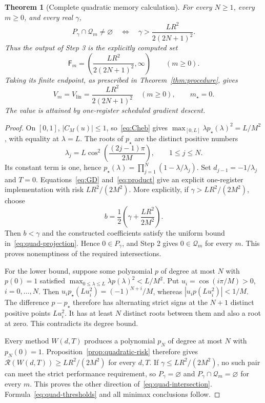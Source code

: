 \documentclass[11pt]{article}
\numberwithin{equation}{section}
\newtheorem{theorem}{Theorem}[section]
\theoremstyle{definition}
\newcommand{\Q}{\mathcal Q}
\newcommand{\risk}{\mathcal R}
\begin{document}
\begin{theorem}[Complete quadratic memory calculation]\label{thm:quadratic}
For every $N\ge1$, every $m\ge0$, and every real $\gamma$,
\begin{equation}
 P_\gamma\cap\Q_m\ne\varnothing
 \quad\Longleftrightarrow\quad
 \gamma>\frac{LR^2}{2(2N+1)^2}.
 \label{eq:quad-intersection}
\end{equation}
Thus the output of Step 3 is the explicitly computed set
\begin{equation}
 \mathsf F_m=\left(\frac{LR^2}{2(2N+1)^2},\infty\right)
 \qquad(m\ge0).
 \label{eq:quad-thresholds}
\end{equation}
Taking its finite endpoint, as prescribed in Theorem~\ref{thm:procedure}, gives
\begin{equation}
 V_m=V_{\mathrm{lin}}=\frac{LR^2}{2(2N+1)^2}
 \quad(m\ge0),\qquad m_\star=0.
 \label{eq:quad-values}
\end{equation}
The value is attained by one-register scheduled gradient descent.
\end{theorem}
\begin{proof}
On $[0,1]$, $|C_M(u)|\le1$, so~\eqref{eq:Cheb} gives
$\max_{[0,L]}\lambda p_\star(\lambda)^2=L/M^2$, with equality at $\lambda=L$.
The roots of $p_\star$ are the distinct positive numbers
\[
 \lambda_j=L\cos^2\left(\frac{(2j-1)\pi}{2M}\right),
 \qquad 1\le j\le N.
\]
Its constant term is one, hence
$p_\star(\lambda)=\prod_{j=1}^N(1-\lambda/\lambda_j)$.
Set $d_{j-1}=-1/\lambda_j$ and $T=0$. Equations~\eqref{eq:GD} and~\eqref{eq:product} give an explicit one-register implementation with risk $LR^2/(2M^2)$.
More explicitly, if $\gamma>LR^2/(2M^2)$, choose
\[
 b=\frac12\left(\gamma+\frac{LR^2}{2M^2}\right).
\]
Then $b<\gamma$ and the constructed coefficients satisfy the uniform bound in~\eqref{eq:quad-projection}. Hence $0\in P_\gamma$, and Step 2 gives $0\in\Q_m$ for every $m$. This proves nonemptiness of the required intersections.

For the lower bound, suppose some polynomial $p$ of degree at most $N$ with $p(0)=1$ satisfied $\max_{0\le\lambda\le L}\lambda p(\lambda)^2<L/M^2$. Put
$u_i=\cos(i\pi/M)>0$, $i=0,\ldots,N$.
Then $u_i p_\star(Lu_i^2)=(-1)^{N+i}/M$, whereas
$|u_i p(Lu_i^2)|<1/M$. The difference $p-p_\star$ therefore has alternating strict signs at the $N+1$ distinct positive points $Lu_i^2$. It has at least $N$ distinct roots between them and also a root at zero. This contradicts its degree bound.

Every method $W(d,T)$ produces a polynomial $p_N$ of degree at most $N$ with $p_N(0)=1$. Proposition~\ref{prop:quadratic-risk} therefore gives $\risk(W(d,T))\ge LR^2/(2M^2)$ for every $d,T$. If $\gamma\le LR^2/(2M^2)$, no such pair can meet the strict performance requirement, so $P_\gamma=\varnothing$ and $P_\gamma\cap\Q_m=\varnothing$ for every $m$. This proves the other direction of~\eqref{eq:quad-intersection}. Formula~\eqref{eq:quad-thresholds} and all minimax conclusions follow.
\end{proof}
\end{document}
